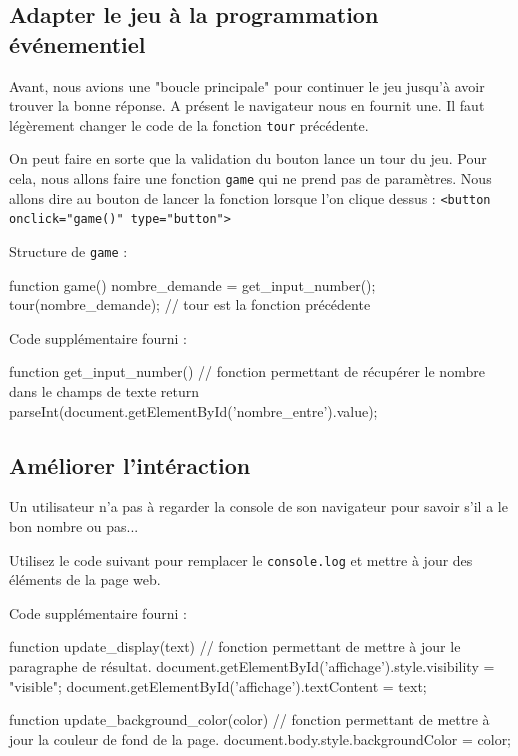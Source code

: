 \documentclass{article} %
\newcommand{\codeJSinline}[2] {
	#1 : \texttt{#2} \linebreak
  }
\newenvironment{codeJS}[1]{%
#1 :  %
\minted{javascript}%
}{%
\endminted%
}
\begin{document}
\subsection{Adapter le jeu à la programmation événementiel}

Avant, nous avions une "boucle principale" pour continuer le jeu jusqu'à avoir trouver la bonne réponse. A présent le navigateur nous en fournit une. Il faut légèrement changer le code de la fonction \texttt{tour} précédente. 

On peut faire en sorte que la validation du bouton lance un tour du jeu. Pour cela, nous allons faire une fonction \texttt{game} qui ne prend pas de paramètres. Nous allons dire au bouton de lancer la fonction lorsque l'on clique \codeJSinline{dessus} {<button onclick="game()" type="button">}

\begin{codeJS}{Structure de \texttt{game}}
	function game() {
		nombre_demande = get_input_number();
		tour(nombre_demande); // tour est la fonction précédente
	}

\end{codeJS}

\begin{codeJS}{Code supplémentaire fourni}
	function get_input_number(){
		// fonction permettant de récupérer le nombre dans le champs de texte
		return parseInt(document.getElementById('nombre_entre').value);
	}
\end{codeJS}


\subsection{Améliorer l'intéraction}

Un utilisateur n'a pas à regarder la console de son navigateur pour savoir s'il a le bon nombre ou pas... 

Utilisez le code suivant pour remplacer le \texttt{console.log} et mettre à jour des éléments de la page web.

\begin{codeJS}{Code supplémentaire fourni}
	function update_display(text){
		// fonction permettant de mettre à jour le paragraphe de résultat.
		document.getElementById('affichage').style.visibility = "visible";
		document.getElementById('affichage').textContent = text;
	}

	function update_background_color(color){
		// fonction permettant de mettre à jour la couleur de fond de la page.
		document.body.style.backgroundColor = color;
	}

\end{codeJS}
\end{document}
